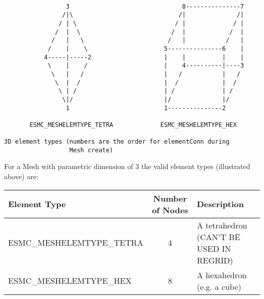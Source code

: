 \begin{verbatim}
                                            
                 3                               8---------------7
                /|\                             /|              /|
               / | \                           / |             / |
              /  |  \                         /  |            /  |
             /   |   \                       /   |           /   |
            /    |    \                     5---------------6    |
           4-----|-----2                    |    |          |    |
            \    |    /                     |    4----------|----3
             \   |   /                      |   /           |   /
              \  |  /                       |  /            |  /
               \ | /                        | /             | /
                \|/                         |/              |/
                 1                          1---------------2

       ESMC_MESHELEMTYPE_TETRA             ESMC_MESHELEMTYPE_HEX  

3D element types (numbers are the order for elementConn during 
                  Mesh create)

\end{verbatim}

For a Mesh with parametric dimension of 3 the valid element types (illustrated above) are:

\smallskip

\begin{tabular}{|l|c|l|}
\hline
Element Type & Number of Nodes & Description \\
\hline
ESMC\_MESHELEMTYPE\_TETRA & 4 & A tetrahedron (CAN'T BE USED IN REGRID) \\
ESMC\_MESHELEMTYPE\_HEX  & 8 & A hexahedron (e.g. a cube) \\
\hline
\end{tabular}


